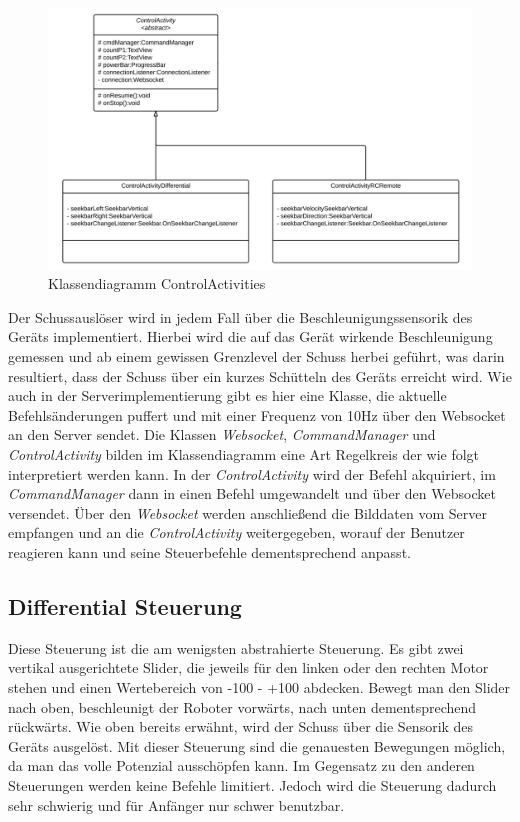 \begin{figure}[!h]
	\includegraphics[width=\textwidth]{images/uml_controlactivity_android.pdf}
	\caption{Klassendiagramm ControlActivities}
	\label{fig:uml_controlactivity_android}
\end{figure}

Der Schussauslöser wird in jedem Fall über die Beschleunigungssensorik des Geräts implementiert. Hierbei wird die auf das Gerät wirkende Beschleunigung gemessen und ab einem gewissen Grenzlevel der Schuss herbei geführt, was darin resultiert, dass der Schuss über ein kurzes Schütteln des Geräts erreicht wird.
Wie auch in der Serverimplementierung gibt es hier eine Klasse, die aktuelle Befehlsänderungen puffert und mit einer Frequenz von 10Hz über den Websocket an den Server sendet.
Die Klassen \textit{Websocket}, \textit{CommandManager} und \textit{ControlActivity} bilden im Klassendiagramm eine Art Regelkreis der wie folgt interpretiert werden kann. In der \textit{ControlActivity} wird der Befehl akquiriert, im \textit{CommandManager} dann in einen Befehl umgewandelt und über den Websocket versendet. Über den \textit{Websocket} werden anschließend die Bilddaten vom Server empfangen und an die \textit{ControlActivity} weitergegeben, worauf der Benutzer reagieren kann und seine Steuerbefehle dementsprechend anpasst.
 

\subsection{Differential Steuerung}
\label{sec:differentialsteuerung}

Diese Steuerung ist die am wenigsten abstrahierte Steuerung. Es gibt zwei vertikal ausgerichtete Slider, die jeweils für den linken oder den rechten Motor stehen und einen Wertebereich von -100 - +100 abdecken. Bewegt man den Slider nach oben, beschleunigt der Roboter vorwärts, nach unten dementsprechend rückwärts. Wie oben bereits erwähnt, wird der Schuss über die Sensorik des Geräts ausgelöst. Mit dieser Steuerung sind die genauesten Bewegungen möglich, da man das volle Potenzial ausschöpfen kann. Im Gegensatz zu den anderen Steuerungen werden keine Befehle limitiert. Jedoch wird die Steuerung dadurch sehr schwierig und für Anfänger nur schwer benutzbar.

